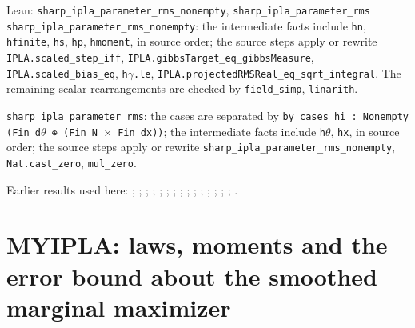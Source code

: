 \documentclass[11pt,a4paper]{report}
\begin{document}
\begin{leanbox}{Lean: \texttt{sharp\_\allowbreak{}ipla\_\allowbreak{}parameter\_\allowbreak{}rms\_\allowbreak{}nonempty}, \texttt{sharp\_\allowbreak{}ipla\_\allowbreak{}parameter\_\allowbreak{}rms}}
\texttt{sharp\_\allowbreak{}ipla\_\allowbreak{}parameter\_\allowbreak{}rms\_\allowbreak{}nonempty}: the intermediate facts include \texttt{hn}, \texttt{hfinite}, \texttt{hs}, \texttt{hp}, \texttt{hmoment}, in source order; the source steps apply or rewrite \texttt{IPLA.\allowbreak{}scaled\_\allowbreak{}step\_\allowbreak{}iff}, \texttt{IPLA.\allowbreak{}gibbs\allowbreak{}Target\_\allowbreak{}eq\_\allowbreak{}gibbs\allowbreak{}Measure}, \texttt{IPLA.\allowbreak{}scaled\_\allowbreak{}bias\_\allowbreak{}eq}, \texttt{h\ensuremath{\gamma}.\allowbreak{}le}, \texttt{IPLA.\allowbreak{}projected\allowbreak{}RMSReal\_\allowbreak{}eq\_\allowbreak{}sqrt\_\allowbreak{}integral}. The remaining scalar rearrangements are checked by \texttt{field\_\allowbreak{}simp}, \texttt{linarith}.



\texttt{sharp\_\allowbreak{}ipla\_\allowbreak{}parameter\_\allowbreak{}rms}: the cases are separated by \texttt{by\_\allowbreak{}cases hi : Nonempty (Fin d\ensuremath{\theta} ⊕ (Fin N \ensuremath{\times} Fin dx))}; the intermediate facts include \texttt{h\ensuremath{\theta}}, \texttt{hx}, in source order; the source steps apply or rewrite \texttt{sharp\_\allowbreak{}ipla\_\allowbreak{}parameter\_\allowbreak{}rms\_\allowbreak{}nonempty}, \texttt{Nat.\allowbreak{}cast\_\allowbreak{}zero}, \texttt{mul\_\allowbreak{}zero}.
\end{leanbox}


Earlier results used here: \cite[Section~3.17.4]{LangevinLean2026ULASC}; \cite[Section~3.26.3]{LangevinLean2026ULASC}; \cite[Section~3.45.6]{LangevinLean2026ULASC}; \cite[Section~3.50.2]{LangevinLean2026ULASC}; \cite[Section~3.50.3]{LangevinLean2026ULASC}; \cite[Section~3.1.1]{LangevinLean2026IPLA}; \cite[Section~3.1.3]{LangevinLean2026IPLA}; \cite[Section~3.1.4]{LangevinLean2026IPLA}; \cite[Section~3.1.6]{LangevinLean2026IPLA}; \cite[Section~3.16.3]{LangevinLean2026IPLA}; \cite[Section~3.18.2]{LangevinLean2026IPLA}; \cite[Section~3.3.1]{LangevinLean2026IPLA}; \cite[Section~3.3.2]{LangevinLean2026IPLA}; \cite[Section~3.3.3]{LangevinLean2026IPLA}; \cite[Section~3.5.1]{LangevinLean2026IPLA}; \cite[Section~3.7.1]{LangevinLean2026IPLA}.
\section{\texorpdfstring{MYIPLA: laws, moments and the error bound about the smoothed marginal maximizer}{MYIPLA: laws, moments and the error bound about the smoothed marginal maximizer}}
\label{proof-module-ProximalLangevin-MYIPLA-lean}
\end{document}
